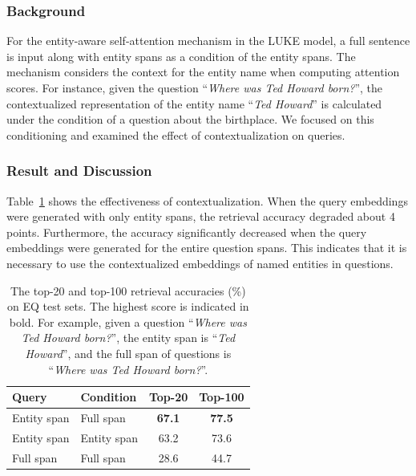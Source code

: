 \documentclass[letterpaper]{article} %
\begin{document}
\subsubsection{Background}
For the entity-aware self-attention mechanism in the LUKE model, a full sentence is input along with entity spans as a condition of the entity spans.
The mechanism considers the context for the entity name when computing attention scores.
For instance, given the question ``\textit{Where was Ted Howard born?}'', the contextualized representation of the entity name ``\textit{Ted Howard}'' is calculated under the condition of a question about the birthplace.
We focused on this conditioning and examined the effect of contextualization on queries.

\subsubsection{Result and Discussion}
Table~\ref{tab:conditioning} shows the effectiveness of contextualization.
When the query embeddings were generated with only entity spans, the retrieval accuracy degraded about 4 points.
Furthermore, the accuracy significantly decreased when the query embeddings were generated for the entire question spans.
This indicates that it is necessary to use the contextualized embeddings of named entities in questions.


\begin{table}[t]
	\centering
	\begin{tabular}{llcc}
		\toprule
		\textbf{Query} & \textbf{Condition} & \textbf{Top-20} & \textbf{Top-100} \\
		\midrule
		Entity span    & Full span          & \textbf{67.1}   & \textbf{77.5}    \\
		Entity span    & Entity span        & 63.2            & 73.6             \\
		Full span      & Full span          & 28.6            & 44.7             \\
		\bottomrule
	\end{tabular}
	\caption{
		The top-20 and top-100 retrieval accuracies (\%) on EQ test sets. The highest score is indicated in bold.
		For example, given a question ``\textit{Where was Ted Howard born?}'', the entity span is ``\textit{Ted Howard}'', and the full span of questions is ``\textit{Where was Ted Howard born?}''.
	}
	\label{tab:conditioning}
\end{table}
\end{document}
